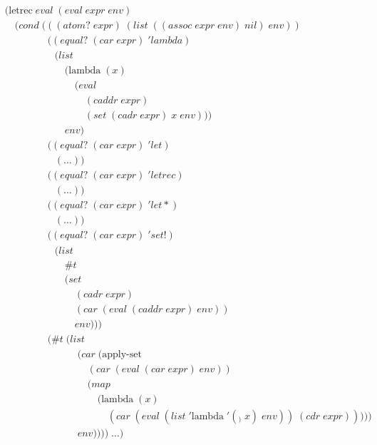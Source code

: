 \begin{figure}[ht]
\caption{}\label{scheme}
\begin{align*}
& (\text{letrec} \; eval \; (eval \; expr \; env)
\\& \quad (cond \; (((atom? \; expr) \; (list \; ((assoc \; expr \; env) \; nil) \; env))
\\& \qquad \qquad \; ((equal? \; (car \; expr) \; 'lambda) \; 
\\& \qquad \qquad \quad (list
\\& \qquad \qquad \qquad (\text{lambda} \; (x) \; 
\\& \qquad \qquad \qquad \quad (eval \; 
\\& \qquad \qquad \qquad \qquad (caddr \; expr) \; 
\\& \qquad \qquad \qquad \qquad (set \; (cadr \; expr) \; x \; env)))
\\& \qquad \qquad \qquad env)
\\& \qquad \qquad \; ((equal? \; (car \; expr) \; 'let)
\\& \qquad \qquad \quad (\dots))
\\& \qquad \qquad \; ((equal? \; (car \; expr) \; 'letrec)
\\& \qquad \qquad \quad (\dots))
\\& \qquad \qquad \; ((equal? \; (car \; expr) \; 'let*) \; 
\\& \qquad \qquad \quad (\dots))
\\& \qquad \qquad \; ((equal? \; (car \; expr) \; 'set!)
\\& \qquad \qquad \quad (list \; 
\\& \qquad \qquad \qquad \#t \; 
\\& \qquad \qquad \qquad (set \; 
\\& \qquad \qquad \qquad \quad (cadr \; expr) \; 
\\& \qquad \qquad \qquad \quad (car \; (eval \; (caddr \; expr) \; env)) \; 
\\& \qquad \qquad \qquad \quad env)))
\\& \qquad \qquad \; (\#t \; (list
\\& \qquad \qquad \qquad \quad \; (car \; (\text{apply-set} \; 
\\& \qquad \qquad \qquad \qquad \; (car \; (eval \; (car \; expr) \; env))
\\& \qquad \qquad \qquad \qquad \; (map \; 
\\& \qquad \qquad \qquad \qquad \quad \; (\text{lambda} \; (x) \; 
\\& \qquad \qquad \qquad \qquad \qquad \; (car \; (eval \; (list \; '\text{lambda} \; '(_) \; x) \; env)) \; (cdr \; expr)))))
\\& \qquad \qquad \qquad \quad \; env)))) \; \dots)
\end{align*}
\end{figure}

